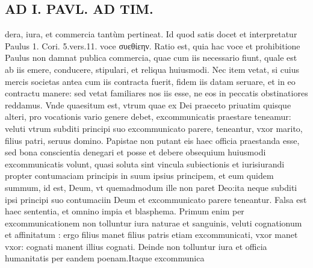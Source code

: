 \documentclass{article}
\begin{document}
\begin{pages}
\section*{AD I. PAVL. AD TIM. }
\marginpar{[ p.400 ]}\pstart dera, iura, et commercia tantùm pertineat. Id quod satis docet et interpretatur Paulus 1. Cori. 5.vers.11. voce συεθίεην. Ratio est, quia hac voce et prohibitione Paulus non damnat publica commercia, quae cum iis necessario fiunt, quale est ab iis emere, conducere, stipulari, et reliqua huiusmodi. Nec item vetat, si cuius mercis societas antea cum iis contracta fuerit, fidem iis datam seruare, et in eo contractu manere: sed vetat familiares nos iis esse, ne eos in peccatis obstinatiores reddamus.  \pend\pstart Vnde quaesitum est, vtrum quae ex Dei praeceto priuatim quisque alteri, pro vocationis vario genere debet, excommunicatis praestare teneamur: veluti vtrum subditi principi suo excommunicato parere, teneantur, vxor marito, filius patri, seruus domino. Papistae non putant eis haec officia praestanda esse, sed bona conscientia denegari et posse et debere obsequium huiusmodi excommunicatis volunt, quasi soluta sint vincula subiectionis et iurisiurandi propter contumaciam principis in suum ipsius principem, et eum quidem summum, id est, Deum, vt quemadmodum ille non paret Deo:ita neque subditi ipsi principi suo contumaciin Deum et excommunicato parere teneantur. Falsa est haec sententia, et omnino impia et blasphema. Primum enim per excommunicationem non tolluntur iura naturae et sanguinis, veluti cognationum et affinitatum : ergo filius manet filius patris etiam excommunicati, vxor manet vxor: cognati manent illius cognati.  \pend\pstart Deinde non tolluntur iura et officia humanitatis per eandem poenam.Itaque excommunica\pend

\end{pages}
\end{document}
